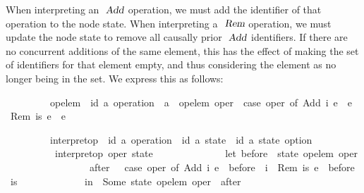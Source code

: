When interpreting an $\isa{Add}$ operation, we must add the identifier of that operation to the node state.
When interpreting a $\isa{Rem}$ operation, we must update the node state to remove all causally prior $\isa{Add}$ identifiers.
If there are no concurrent additions of the same element, this has the effect of making the set of identifiers for that element empty, and thus considering the element as no longer being in the set.
We express this as follows:
\vspace{0.25em}
\begin{isabellebody}
\ \ \ \ \ \ \ \ \ op{\isacharunderscore}elem\ {\isacharcolon}{\isacharcolon}\ {\isachardoublequoteopen}{\isacharparenleft}{\isacharprime}id{\isacharcomma}\ {\isacharprime}a{\isacharparenright}\ operation\ {\isasymRightarrow}\ {\isacharprime}a{\isachardoublequoteclose}\ \ {\isachardoublequoteopen}op{\isacharunderscore}elem\ oper\ {\isasymequiv}\ case\ oper\ of\ Add\ i\ e\ {\isasymRightarrow}\ e\ {\isacharbar}\ Rem\ is\ e\ {\isasymRightarrow}\ e{\isachardoublequoteclose}
\end{isabellebody}
\vspace{0.25em}
\begin{isabellebody}
\ \ \ \ \ \ \ \ \ interpret{\isacharunderscore}op\ {\isacharcolon}{\isacharcolon}\ {\isachardoublequoteopen}{\isacharparenleft}{\isacharprime}id{\isacharcomma}\ {\isacharprime}a{\isacharparenright}\ operation\ {\isasymRightarrow}\ {\isacharparenleft}{\isacharprime}id{\isacharcomma}\ {\isacharprime}a{\isacharparenright}\ state\ {\isasymRightarrow}\ {\isacharparenleft}{\isacharprime}id{\isacharcomma}\ {\isacharprime}a{\isacharparenright}\ state\ option{\isachardoublequoteclose}\ \isanewline
\ \ \ \ \ \ \ \ \ \ {\isachardoublequoteopen}interpret{\isacharunderscore}op\ oper\ state\ {\isasymequiv}\isanewline
\ \ \ \ \ \ \ \ \ \ \ \ \ let\ before\ {\isacharequal}\ state\ {\isacharparenleft}op{\isacharunderscore}elem\ oper{\isacharparenright}{\isacharsemicolon}\isanewline
\ \ \ \ \ \ \ \ \ \ \ \ \ \ \ \ \ after\ \ {\isacharequal}\ case\ oper\ of\ Add\ i\ e\ {\isasymRightarrow}\ before\ {\isasymunion}\ {\isacharbraceleft}i{\isacharbraceright}\ {\isacharbar}\ Rem\ is\ e\ {\isasymRightarrow}\ before\ {\isacharminus}\ is\isanewline
\ \ \ \ \ \ \ \ \ \ \ \ \ in\ \ Some\ {\isacharparenleft}state\ {\isacharparenleft}{\isacharparenleft}op{\isacharunderscore}elem\ oper{\isacharparenright}\ {\isacharcolon}{\isacharequal}\ after{\isacharparenright}{\isacharparenright}{\isachardoublequoteclose}
\end{isabellebody}
